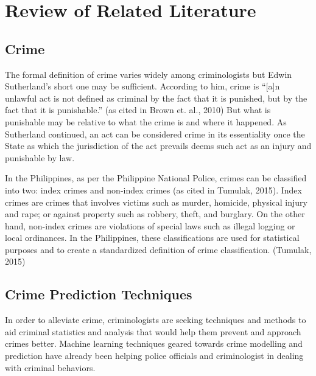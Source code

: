 
\chapter{Review of Related Literature}  %

\section{Crime} %
    The formal definition of crime varies widely among criminologists but Edwin Sutherland’s short one may be sufficient. According to him, crime is “[a]n unlawful act is not defined as criminal by the fact that it is punished, but by the fact that it is punishable.” (as cited in Brown et. al., 2010) But what is punishable may be relative to what the crime is and where it happened. As Sutherland continued, an act can be considered crime in its essentiality once the State as which the jurisdiction of the act prevails deems such act as an injury and punishable by law.

    In the Philippines, as per the Philippine National Police, crimes can be classified into two: index crimes and non-index crimes (as cited in Tumulak, 2015). Index crimes are crimes that involves victims such as murder, homicide, physical injury and rape; or against property such as robbery, theft, and burglary. On the other hand, non-index crimes are violations of special laws such as illegal logging or local ordinances. In the Philippines, these classifications are used for statistical purposes and to create a standardized definition of crime classification. (Tumulak, 2015)

\section{Crime Prediction Techniques} %
    In order to alleviate crime, criminologists are seeking techniques and methods to aid criminal statistics and analysis that would help them prevent and approach crimes better. Machine learning techniques geared towards crime modelling and prediction have already been helping police officials and criminologist in dealing with criminal behaviors.

